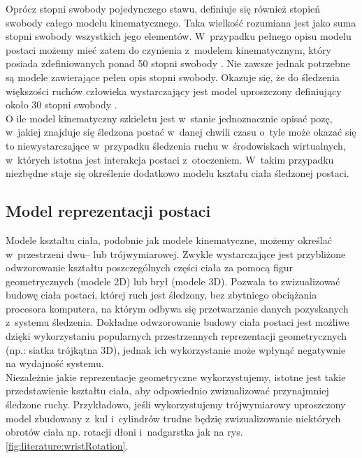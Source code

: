 Oprócz stopni swobody pojedynczego stawu, definiuje się również stopień swobody całego modelu kinematycznego. Taka wielkość rozumiana jest jako suma stopni swobody wszystkich jego elementów. W~przypadku pełnego opisu modelu postaci możemy mieć zatem do czynienia z~modelem kinematycznym, który posiada zdefiniowanych ponad 50 stopni swobody \cite{Agarwal2006}. Nie zawsze jednak potrzebne są modele zawierające pełen opis stopni swobody. Okazuje się, że do śledzenia większości ruchów człowieka wystarczający jest model uproszczony definiujący około 30 stopni swobody \cite{Sigal2006,Kwolek2011}.\\

O ile model kinematyczny szkieletu jest w~stanie jednoznacznie opisać pozę, w~jakiej znajduje się śledzona postać w~danej chwili czasu o~tyle może okazać się to niewystarczające w~przypadku śledzenia ruchu w~środowiskach wirtualnych, w~których istotna jest interakcja postaci z~otoczeniem. W~takim przypadku niezbędne staje się określenie dodatkowo modelu kształu ciała śledzonej postaci.
		
\subsection{Model reprezentacji postaci}
Modele kształtu ciała, podobnie jak modele kinematyczne, możemy określać w~przestrzeni dwu-- lub trójwymiarowej. Zwykle wystarczające jest przybliżone odwzorowanie kształtu poszczególnych części ciała za pomocą figur geometrycznych (modele 2D) lub brył (modele 3D). Pozwala to zwizualizować budowę ciała postaci, której ruch jest śledzony, bez zbytniego obciążania procesora komputera, na którym odbywa się przetwarzanie danych pozyskanych z~systemu śledzenia. Dokładne odwzorowanie budowy ciała postaci jest możliwe dzięki wykorzystaniu popularnych przestrzennych reprezentacji geometrycznych (np.: siatka trójkątna 3D), jednak ich wykorzystanie może wpłynąć negatywnie na wydajność systemu. \\
Niezależnie jakie reprezentacje geometryczne wykorzystujemy, istotne jest takie przedstawienie kształtu ciała, aby odpowiednio zwizualizować przynajmniej śledzone ruchy. Przykładowo, jeśli wykorzystujemy trójwymiarowy uproszczony model zbudowany z~kul i~cylindrów trudne będzię zwizualizowanie niektórych obrotów ciała np. rotacji dłoni i~nadgarstka jak na rys. \ref{fig:literature:wristRotation}.\\
		

